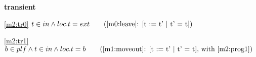\textbf{transient}
\begin{block}
\item[ \eqref{m2:tr0} ]$t \in in \land loc.t = ext  \qquad \text{(\ref{m0:leave}: [t := t' | t' = t])}$ %
\item[ \eqref{m2:tr1} ]$b \in plf \land t \in in \land loc.t = b  \qquad \text{(\ref{m1:moveout}: [t := t' | t' = t], with \eqref{m2:prog1})}$ %
\end{block}
